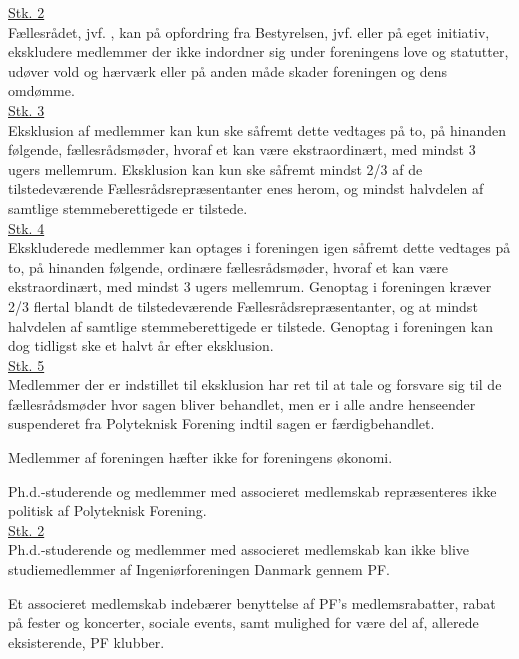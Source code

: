 \begin{list}
\underline{Stk. 2} \\
Fællesrådet, jvf. , kan på opfordring fra Bestyrelsen, jvf.  eller på eget initiativ, ekskludere medlemmer der ikke indordner sig under foreningens love og statutter, udøver vold og hærværk eller på anden måde skader foreningen og dens omdømme.\\

\underline{Stk. 3}\\
Eksklusion af medlemmer kan kun ske såfremt dette vedtages på to, på hinanden følgende, fællesrådsmøder, hvoraf et kan være ekstraordinært, med mindst 3 ugers mellemrum. Eksklusion kan kun ske såfremt mindst 2/3 af de tilstedeværende Fællesrådsrepræsentanter enes herom, og mindst halvdelen af
samtlige stemmeberettigede er tilstede.\\

\underline{Stk. 4}\\
Ekskluderede medlemmer kan optages i foreningen igen såfremt dette vedtages på to, på hinanden følgende, ordinære fællesrådsmøder, hvoraf et kan være ekstraordinært, med mindst 3 ugers mellemrum. Genoptag i foreningen kræver 2/3 flertal blandt de tilstedeværende Fællesrådsrepræsentanter, og at mindst halvdelen af samtlige stemmeberettigede er tilstede. Genoptag i foreningen kan dog tidligst ske et halvt år efter eksklusion.\\

\underline{Stk. 5}\\
Medlemmer der er indstillet til eksklusion har ret til at tale og forsvare sig til de fællesrådsmøder hvor sagen bliver behandlet, men er i alle andre henseender suspenderet fra Polyteknisk Forening indtil sagen er færdigbehandlet.
\item Medlemmer af foreningen hæfter ikke for foreningens økonomi.

\item \label{L:medlem:PHD} Ph.d.-studerende og medlemmer med associeret medlemskab repræsenteres ikke politisk af Polyteknisk Forening.\\

\underline{Stk. 2}\\
Ph.d.-studerende og medlemmer med associeret medlemskab kan ikke blive studiemedlemmer af Ingeniørforeningen Danmark gennem PF.

\item Et associeret medlemskab indebærer benyttelse af PF’s medlemsrabatter, rabat på fester og koncerter, sociale events, samt mulighed for være del af, allerede eksisterende, PF klubber.


\end{list}
